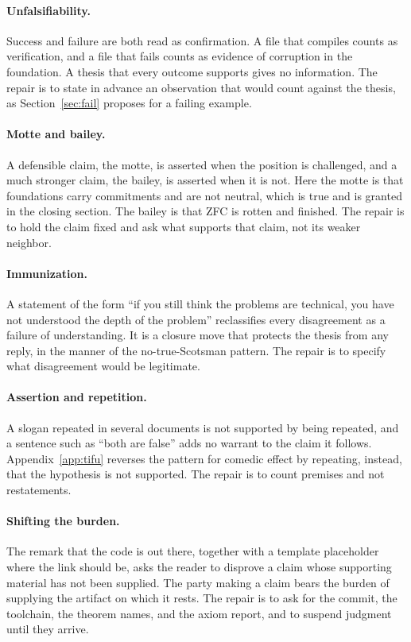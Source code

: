 \documentclass[11pt]{article}
\begin{document}
\paragraph{Unfalsifiability.} Success and failure are both read as confirmation. A file that compiles counts as verification, and a file that fails counts as evidence of corruption in the foundation. A thesis that every outcome supports gives no information. The repair is to state in advance an observation that would count against the thesis, as Section~\ref{sec:fail} proposes for a failing example.

\paragraph{Motte and bailey.} A defensible claim, the motte, is asserted when the position is challenged, and a much stronger claim, the bailey, is asserted when it is not. Here the motte is that foundations carry commitments and are not neutral, which is true and is granted in the closing section. The bailey is that ZFC is rotten and finished. The repair is to hold the claim fixed and ask what supports that claim, not its weaker neighbor.

\paragraph{Immunization.} A statement of the form ``if you still think the problems are technical, you have not understood the depth of the problem'' reclassifies every disagreement as a failure of understanding. It is a closure move that protects the thesis from any reply, in the manner of the no-true-Scotsman pattern. The repair is to specify what disagreement would be legitimate.

\paragraph{Assertion and repetition.} A slogan repeated in several documents is not supported by being repeated, and a sentence such as ``both are false'' adds no warrant to the claim it follows. Appendix~\ref{app:tifu} reverses the pattern for comedic effect by repeating, instead, that the hypothesis is not supported. The repair is to count premises and not restatements.

\paragraph{Shifting the burden.} The remark that the code is out there, together with a template placeholder where the link should be, asks the reader to disprove a claim whose supporting material has not been supplied. The party making a claim bears the burden of supplying the artifact on which it rests. The repair is to ask for the commit, the toolchain, the theorem names, and the axiom report, and to suspend judgment until they arrive.
\end{document}
